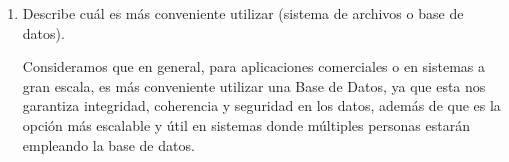 \begin{enumerate}
    \newpage
  \item Describe cuál es más conveniente utilizar (sistema de archivos o base de datos).
    
    Consideramos que en general, para aplicaciones comerciales o en sistemas a gran escala, es más conveniente utilizar una Base de Datos, ya que esta nos garantiza integridad, coherencia y seguridad en los datos, además de que es la opción más escalable y útil en sistemas donde múltiples personas estarán empleando la base de datos.
\end{enumerate}
